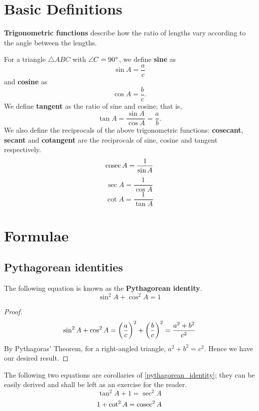 \section{Basic Definitions}
\textbf{Trigonometric functions} describe how the ratio of lengths vary according to the angle between the lengths.

For a triangle $\triangle ABC$ with $\angle C=90\degree$, we define \textbf{sine} as
\begin{equation}
\sin A=\frac{a}{c}
\end{equation}
and \textbf{cosine} as
\begin{equation}
\cos A=\frac{b}{c}.
\end{equation}
We define \textbf{tangent} as the ratio of sine and cosine; that is,
\begin{equation}
\tan A=\frac{\sin A}{\cos A}=\frac{a}{b}.
\end{equation}
We also define the reciprocals of the above trigonometric functions: \textbf{cosecant}, \textbf{secant} and \textbf{cotangent} are the reciprocals of sine, cosine and tangent respectively.
\begin{equation}
\operatorname{cosec} A=\frac{1}{\sin A}
\end{equation}
\begin{equation}
\sec A=\frac{1}{\cos A}
\end{equation}
\begin{equation}
\cot A=\frac{1}{\tan A}
\end{equation}

\section{Formulae}
\subsection{Pythagorean identities}
The following equation is known as the \textbf{Pythagorean identity}.
\begin{equation}\label{pythagorean_identity}
\sin^2 A + \cos^2 A = 1
\end{equation}
\begin{proof}
\[ \sin^2A+\cos^2A=\left(\frac{a}{c}\right)^2+\left(\frac{b}{c}\right)^2=\frac{a^2+b^2}{c^2} \]
By Pythagoras' Theorem, for a right-angled triangle, $a^2+b^2=c^2$. Hence we have our desired result.
\end{proof}
The following two equations are corollaries of \cref{pythagorean_identity}; they can be easily derived and shall be left as an exercise for the reader.
\[ \tan^2 A + 1 = \sec^2 A \]
\[ 1 + \cot^2 A = \operatorname{cosec}^2 A \]

